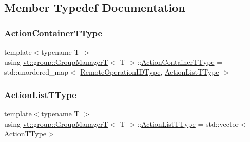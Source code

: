 \subsection{Member Typedef Documentation}
\mbox{\label{structvt_1_1group_1_1_group_manager_t_adc0d6d680c4f8bdbb80cd90f84a5f7ee}} 
\subsubsection{\texorpdfstring{Action\+Container\+T\+Type}{ActionContainerTType}}
{\footnotesize\ttfamily template$<$typename T $>$ \\
using \hyperlink{structvt_1_1group_1_1_group_manager_t}{vt\+::group\+::\+Group\+ManagerT}$<$ T $>$\+::\hyperlink{structvt_1_1group_1_1_group_manager_t_adc0d6d680c4f8bdbb80cd90f84a5f7ee}{Action\+Container\+T\+Type} =  std\+::unordered\+\_\+map$<$ \hyperlink{namespacevt_1_1group_a73f2624ddeb535b39a08b6524f26b244}{Remote\+Operation\+I\+D\+Type}, \hyperlink{structvt_1_1group_1_1_group_manager_t_a653158254f8de50d4070f0621644a48a}{Action\+List\+T\+Type} $>$}

\mbox{\label{structvt_1_1group_1_1_group_manager_t_a653158254f8de50d4070f0621644a48a}} 
\subsubsection{\texorpdfstring{Action\+List\+T\+Type}{ActionListTType}}
{\footnotesize\ttfamily template$<$typename T $>$ \\
using \hyperlink{structvt_1_1group_1_1_group_manager_t}{vt\+::group\+::\+Group\+ManagerT}$<$ T $>$\+::\hyperlink{structvt_1_1group_1_1_group_manager_t_a653158254f8de50d4070f0621644a48a}{Action\+List\+T\+Type} =  std\+::vector$<$\hyperlink{structvt_1_1group_1_1_group_manager_t_acb20922687d3165d97de391fdbaf02ca}{Action\+T\+Type}$>$}

\mbox{\label{structvt_1_1group_1_1_group_manager_t_acb20922687d3165d97de391fdbaf02ca}} 
